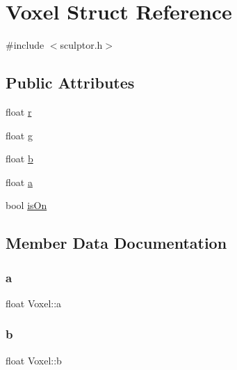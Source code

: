 \hypertarget{struct_voxel}{}\section{Voxel Struct Reference}
\label{struct_voxel}


{\ttfamily \#include $<$sculptor.\+h$>$}

\subsection*{Public Attributes}
\begin{DoxyCompactItemize}
\item 
float \mbox{\hyperlink{struct_voxel_a06872ec79b836120b551a848968c0f1b}{r}}
\item 
float \mbox{\hyperlink{struct_voxel_a27c0da1ed2ff430401d23ff171612a73}{g}}
\item 
float \mbox{\hyperlink{struct_voxel_a5cd8432b1d7d0fd8b79e0fc7d10373a8}{b}}
\item 
float \mbox{\hyperlink{struct_voxel_a3ce2579eb0a9f09a07112ce7498a638e}{a}}
\item 
bool \mbox{\hyperlink{struct_voxel_a6fbe8bd53f64685ac4210726d40fc775}{is\+On}}
\end{DoxyCompactItemize}


\subsection{Member Data Documentation}
\mbox{\label{struct_voxel_a3ce2579eb0a9f09a07112ce7498a638e}} 
\subsubsection{\texorpdfstring{a}{a}}
{\footnotesize\ttfamily float Voxel\+::a}

\mbox{\label{struct_voxel_a5cd8432b1d7d0fd8b79e0fc7d10373a8}} 
\subsubsection{\texorpdfstring{b}{b}}
{\footnotesize\ttfamily float Voxel\+::b}

\mbox{\label{struct_voxel_a27c0da1ed2ff430401d23ff171612a73}} 
